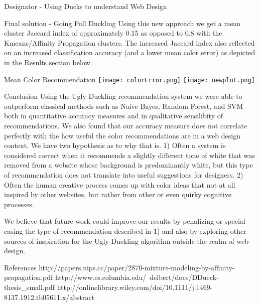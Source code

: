 \documentclass{beamer}
\begin{document}
\begin{frame}{\centerline{\Huge Designator - Using Ducks to understand Web Design}}
\begin{textblock}{5}
\begin{block}{Final solution - Going Full Duckling}
Using this new approach we get a mean cluster Jaccard index of approximately 0.15 as opposed to 0.8 with the
Kmeans/Affinity Propagation clusters. The increased Jaccard index also reflected on an increased classification accuracy
(and a lower mean color error) as depicted in the Results section below.

\end{block}
\begin{block}{Mean Color Recommendation}
\texttt{[image: colorError.png]}
\texttt{[image: newplot.png]}
\end{block}

\begin{block}{Conclusion}
Using the Ugly Duckling recommendation system we were able to outperform classical methods such as Naive Bayes, Random
Forest, and SVM both in quantitative accuracy measures and in qualitative sensilibity of recommendations. We also found
that our accuracy measure does not correlate perfectly with the how useful the color recommendations are in a web design
context. We have two hypothesis as to why that is. 1) Often a system is considered correct when it recommends a slightly
different tone of white that was removed from a website whose background is predominantly white, but this type of
recommendation does not translate into useful suggestions for designers. 2) Often the human creative process comes up
with
color ideas that not at all inspired by other websites, but rather from other or even quirky cognitive processes.

We believe that future work could improve our results by penalizing or special casing the type of recommendation
described in 1) and also by exploring other sources of inspiration for the Ugly Duckling algorithm outside the realm of
web design.
\end{block}

\begin{block}{References}
http://papers.nips.cc/paper/2870-mixture-modeling-by-affinity-propagation.pdf
http://www.cs.columbia.edu/~delbert/docs/DDueck-thesis\_small.pdf
http://onlinelibrary.wiley.com/doi/10.1111/j.1469-8137.1912.tb05611.x/abstract
\end{block}

\end{textblock}


\end{frame}
\end{document}
